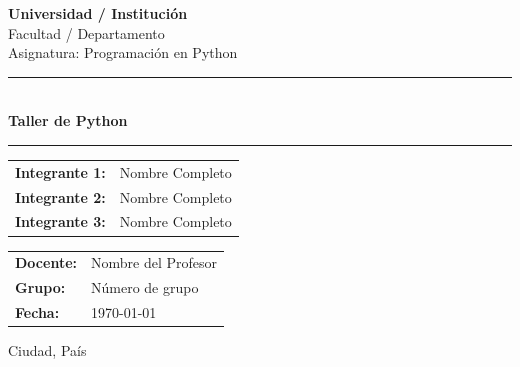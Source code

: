 
\begin{titlepage}
    \centering
    \vspace*{2cm}

    {\LARGE \textbf{Universidad / Institución}}\\[0.5cm]
    {\large Facultad / Departamento}\\[0.3cm]
    {\large Asignatura: Programación en Python}

    \vspace{2cm}
    \rule{\linewidth}{0.5mm}\\[0.4cm]
    {\huge \bfseries Taller de Python}\\[0.2cm]
    \rule{\linewidth}{0.5mm}

    \vspace{2cm}

    \begin{tabular}{ll}
        \textbf{Integrante 1:} & Nombre Completo \\[0.3cm]
        \textbf{Integrante 2:} & Nombre Completo \\[0.3cm]
        \textbf{Integrante 3:} & Nombre Completo \\
    \end{tabular}

    \vspace{2cm}

    \begin{tabular}{ll}
        \textbf{Docente:}  & Nombre del Profesor \\[0.3cm]
        \textbf{Grupo:}    & Número de grupo     \\[0.3cm]
        \textbf{Fecha:}    & \today              \\
    \end{tabular}

    \vfill
    {\large Ciudad, País}
\end{titlepage}
\newpage
